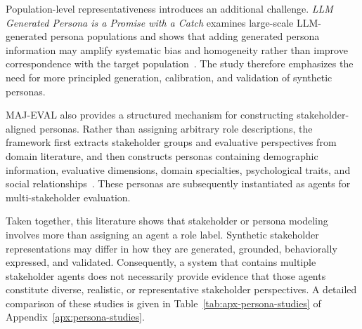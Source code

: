 Population-level representativeness introduces an additional challenge. \emph{LLM Generated Persona is a Promise with a Catch} examines large-scale LLM-generated persona populations and shows that adding generated persona information may amplify systematic bias and homogeneity rather than improve correspondence with the target population~\cite{li2026persona}. The study therefore emphasizes the need for more principled generation, calibration, and validation of synthetic personas.

MAJ-EVAL also provides a structured mechanism for constructing stakeholder-aligned personas. Rather than assigning arbitrary role descriptions, the framework first extracts stakeholder groups and evaluative perspectives from domain literature, and then constructs personas containing demographic information, evaluative dimensions, domain specialties, psychological traits, and social relationships~\cite{chen2026majeval}. These personas are subsequently instantiated as agents for multi-stakeholder evaluation.

Taken together, this literature shows that stakeholder or persona modeling involves more than assigning an agent a role label. Synthetic stakeholder representations may differ in how they are generated, grounded, behaviorally expressed, and validated. Consequently, a system that contains multiple stakeholder agents does not necessarily provide evidence that those agents constitute diverse, realistic, or representative stakeholder perspectives. A detailed comparison of these studies is given in Table~\ref{tab:apx-persona-studies} of Appendix~\ref{apx:persona-studies}.
